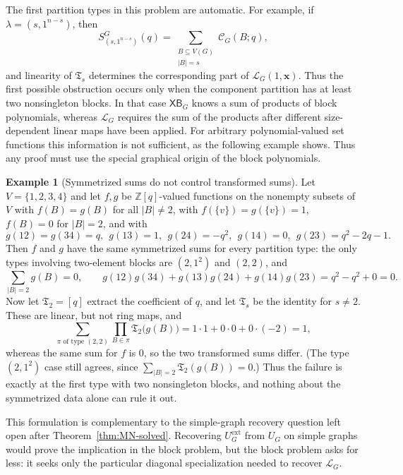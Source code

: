 \documentclass[11pt]{article}
\theoremstyle{plain}
\theoremstyle{definition}
\newtheorem{example}[theorem]{Example}
\renewcommand{\mathcal}{\mathscr}
\newcommand{\LL}{\mathcal{L}}    %
\newcommand{\cC}{\mathcal{C}}    %
\newcommand{\fT}{\mathfrak T}    %
\newcommand{\bx}{\mathbf{x}}
\newcommand{\XB}{\mathsf{XB}} %
\newcommand{\ext}{\mathrm{ext}}
\newcommand{\ZZ}{\mathbb Z}
\numberwithin{equation}{section}
\begin{document}
The first partition types in this problem are automatic.  For example, if
$\lambda=(s,1^{n-s})$, then
\begin{equation}\label{eq:one-block-component}
   S^G_{(s,1^{n-s})}(q)
   =
   \sum_{\substack{B\subseteq V(G)\\|B|=s}}
   \cC_G(B;q),
\end{equation}
and linearity of $\fT_s$ determines the corresponding part of $\LL_G(1,\bx)$.
Thus the first possible obstruction occurs only when the component partition has at least two nonsingleton blocks.
In that case $\XB_G$ knows a sum of products of block polynomials, whereas $\LL_G$
requires the sum of the products after different size-dependent linear maps have been applied.
For arbitrary polynomial-valued set functions this information is not sufficient, as the following example shows.
Thus any proof must use the special graphical origin of the block polynomials.

\begin{example}[Symmetrized sums do not control transformed sums]
\label{ex:block-transform-insufficient}
Let $V=\{1,2,3,4\}$ and let $f,g$ be $\ZZ[q]$-valued functions on the nonempty subsets
of $V$ with $f(B)=g(B)$ for all $|B|\ne 2$, with $f(\{v\})=g(\{v\})=1$, \ $f(B)= 0$ for $|B|=2$, and with
\[
  g(12)=g(34)=q, \ \  g(13)=1,\ \ g(24)=-q^{2}, \ \ g(14)=0,\ \ g(23)=q^{2}-2q-1 .
\]
Then $f$ and $g$ have the same symmetrized sums for every partition type:
the only types involving two-element blocks are $(2,1^2)$ and $(2,2)$, and
\[
   \sum_{|B|=2}g(B)=0,
   \qquad
   g(12)g(34)+g(13)g(24)+g(14)g(23)=q^{2}-q^{2}+0=0 .
\]
Now let $\fT_2=[q]$ extract the coefficient of $q$, and let $\fT_s$ be the identity for $s\ne2$.
These are linear, but not ring maps, and
\[
   \sum_{\pi\text{ of type }(2,2)}\prod_{B\in\pi}\fT_2\bigl(g(B)\bigr)
   =1\cdot1+0\cdot0+0\cdot(-2)=1,
\]
whereas the same sum for $f$ is $0$, so the two transformed sums differ.
(The type $(2,1^2)$ case still agrees, since
$\sum_{|B|=2}\fT_2(g(B))=0$.)  Thus the failure is exactly at the first type with two nonsingleton blocks,
and nothing about the symmetrized data alone can rule it out.
\end{example}

This formulation is complementary to the simple-graph recovery question left open after
Theorem~\ref{thm:MN-solved}.  Recovering $U_G^{\ext}$ from $U_G$ on simple graphs would prove
the implication in the block problem, but the block problem asks for less:
it seeks only the particular diagonal specialization needed to recover $\LL_G$.
\end{document}
